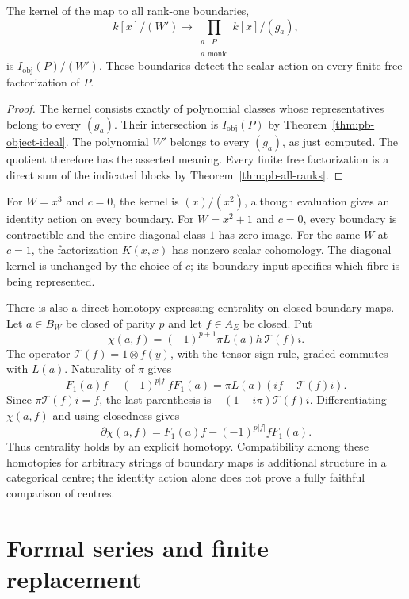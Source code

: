 \begin{proposition}
\label{prop:da-joint-kernel}
The kernel of the map to all rank-one boundaries,
\[
 k[x]/(W')\longrightarrow
       \prod_{\substack{a\mid P\\a\text{ monic}}} k[x]/(g_a),
\]
is \(I_{\mathrm{obj}}(P)/(W')\).
These boundaries detect the scalar action on every finite free
factorization of \(P\).
\end{proposition}
\begin{proof}
The kernel consists exactly of polynomial classes whose
representatives belong to every \((g_a)\).
Their intersection is \(I_{\mathrm{obj}}(P)\) by
Theorem~\ref{thm:pb-object-ideal}.
The polynomial \(W'\) belongs to every \((g_a)\), as just
computed. The quotient therefore has the asserted meaning.
Every finite free factorization is a direct sum of the indicated
blocks by Theorem~\ref{thm:pb-all-ranks}.
\end{proof}

For \(W=x^3\) and \(c=0\), the kernel is
\((x)/(x^2)\), although evaluation gives an identity action on
every boundary. For \(W=x^2+1\) and \(c=0\), every boundary is
contractible and the entire diagonal class \(1\) has zero image.
For the same \(W\) at \(c=1\), the factorization \(K(x,x)\)
has nonzero scalar cohomology. The diagonal kernel is unchanged
by the choice of \(c\); its boundary input specifies which
fibre is being represented.

There is also a direct homotopy expressing centrality on closed
boundary maps. Let \(a\in B_W\) be closed of parity \(p\) and
let \(f\in A_E\) be closed. Put
\[
 \chi(a,f)=(-1)^{p+1}\pi L(a)h\,\mathcal T(f)i .
\]
The operator \(\mathcal T(f)=1\otimes f(y)\), with the tensor
sign rule, graded-commutes with \(L(a)\). Naturality of \(\pi\)
gives
\[
 F_1(a)f-(-1)^{p|f|}fF_1(a)
   =\pi L(a)(if-\mathcal T(f)i).
\]
Since \(\pi\mathcal T(f)i=f\), the last parenthesis is
\(-(1-i\pi)\mathcal T(f)i\). Differentiating \(\chi(a,f)\)
and using closedness gives
\[
 \partial\chi(a,f)
      =F_1(a)f-(-1)^{p|f|}fF_1(a).
\]
Thus centrality holds by an explicit homotopy.
Compatibility among these homotopies for arbitrary strings of
boundary maps is additional structure in a categorical centre;
the identity action alone does not prove a fully faithful
comparison of centres.

\section{Formal series and finite replacement}
\label{sec:da-formal}

